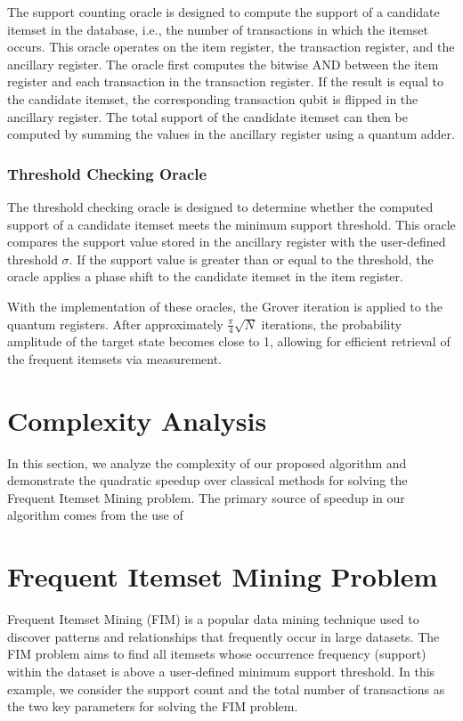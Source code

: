 The support counting oracle is designed to compute the support of a candidate itemset in the database, i.e., the number of transactions in which the itemset occurs. This oracle operates on the item register, the transaction register, and the ancillary register. The oracle first computes the bitwise AND between the item register and each transaction in the transaction register. If the result is equal to the candidate itemset, the corresponding transaction qubit is flipped in the ancillary register. The total support of the candidate itemset can then be computed by summing the values in the ancillary register using a quantum adder.

\subsubsection{Threshold Checking Oracle}
\label{subsubsec:threshold_checking}

The threshold checking oracle is designed to determine whether the computed support of a candidate itemset meets the minimum support threshold. This oracle compares the support value stored in the ancillary register with the user-defined threshold $\sigma$. If the support value is greater than or equal to the threshold, the oracle applies a phase shift to the candidate itemset in the item register.

With the implementation of these oracles, the Grover iteration is applied to the quantum registers. After approximately $\frac{\pi}{4}\sqrt{N}$ iterations, the probability amplitude of the target state becomes close to 1, allowing for efficient retrieval of the frequent itemsets via measurement.

\section{Complexity Analysis}
\label{sec:complexity}

In this section, we analyze the complexity of our proposed algorithm and demonstrate the quadratic speedup over classical methods for solving the Frequent Itemset Mining problem. The primary source of speedup in our algorithm comes from the use of

\section{Frequent Itemset Mining Problem}

Frequent Itemset Mining (FIM) is a popular data mining technique used to discover patterns and relationships that frequently occur in large datasets. The FIM problem aims to find all itemsets whose occurrence frequency (support) within the dataset is above a user-defined minimum support threshold. In this example, we consider the support count and the total number of transactions as the two key parameters for solving the FIM problem.


